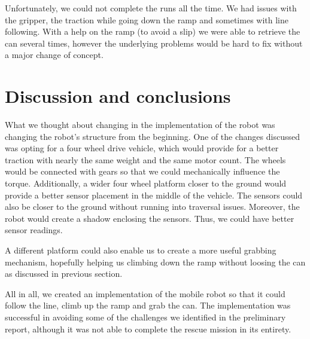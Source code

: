 \documentclass{article}
\begin{document}
Unfortunately, we could not complete the runs all the time. We had issues with the gripper, the traction while going
down the ramp and sometimes with line following. With a help on the ramp (to avoid a slip) we were able to retrieve the
can several times, however the underlying problems would be hard to fix without a major change of concept.

\newpage

\section{Discussion and conclusions}
\label{sec:discussion_and_conclusions}

What we thought about changing in the implementation of the robot was changing the robot's structure from the beginning.
One of the changes discussed was opting for a four wheel drive vehicle, which would provide for a better traction with
nearly the same weight and the same motor count. The wheels would be connected with gears so that we could mechanically
influence the torque. Additionally, a wider four wheel platform closer to the ground would provide a better sensor placement
in the middle of the vehicle. The sensors could also be closer to the ground without running into traversal issues.
Moreover, the robot would create a shadow enclosing the sensors. Thus, we could have better sensor readings.

A different platform could also enable us to create a more useful grabbing mechanism, hopefully helping us climbing
down the ramp without loosing the can as discussed in previous section.

All in all, we created an implementation of the mobile robot so that it could follow the line, climb up the ramp and
grab the can. The implementation was successful in avoiding some of the challenges we identified in the preliminary
report, although it was not able to complete the rescue mission in its entirety.
\end{document}
